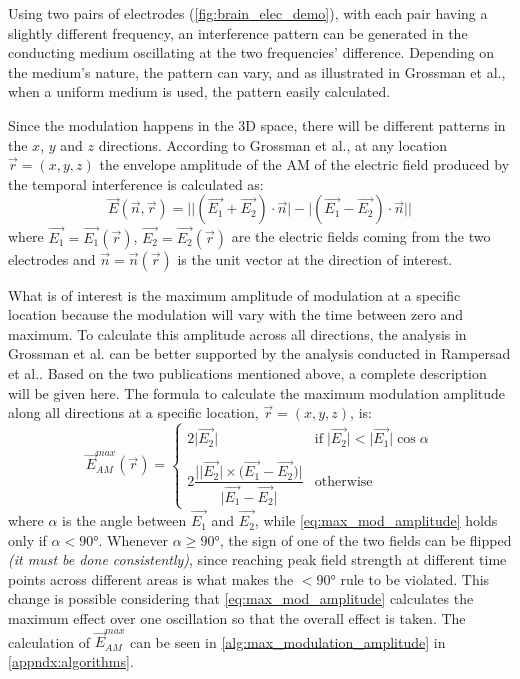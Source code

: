 Using two pairs of electrodes (\autoref{fig:brain_elec_demo}), with each pair having a slightly different frequency, an interference pattern can be generated in the conducting medium oscillating at the two frequencies' difference. Depending on the medium's nature, the pattern can vary, and as illustrated in Grossman et al.\cite{Grossman2017}, when a uniform medium is used, the pattern easily calculated.

Since the modulation happens in the 3D space, there will be different patterns in the $x$, $y$ and $z$ directions. According to Grossman et al.\cite[page 20]{Grossman2017}, at any location $\vec{r} = (x,y,z)$ the envelope amplitude of the \gls{AM} of the electric field produced by the temporal interference is calculated as:
\begin{equation}
    \label{eq:directional_amplitude}
    \vec{E}(\vec{n},\vec{r}) = \Big|\big|(\vec{E_1} + \vec{E_2})\cdot\vec{n}\big| - \big|(\vec{E_1} - \vec{E_2})\cdot\vec{n}\big|\Big|
\end{equation}
where $\vec{E_1} = \vec{E_1}(\vec{r})$, $\vec{E_2} = \vec{E_2}(\vec{r})$ are the electric fields coming from the two electrodes and $\vec{n} = \vec{n}(\vec{r})$ is the unit vector at the direction of interest.
\\\vspace{1pt}

What is of interest is the maximum amplitude of modulation at a specific location because the modulation will vary with the time between zero and maximum. To calculate this amplitude across all directions, the analysis in Grossman et al.\cite[page 20]{Grossman2017} can be better supported by the analysis conducted in Rampersad et al.\cite[section 2.5]{Rampersad2019}. Based on the two publications mentioned above, a complete description will be given here. The formula to calculate the maximum modulation amplitude along all directions at a specific location, $\vec{r} = (x,y,z)$, is:
\begin{equation}
    \label{eq:max_mod_amplitude}
    \vec{E}_{AM}^{max}(\vec{r}) = \begin{cases}
        2\big|\vec{E_2}\big| & \text{if}\; \big|\vec{E_2}\big| < \big|\vec{E_1}\big|\cos\alpha \\
        &\\
      2\dfrac{\Big|\big|\vec{E_2}\big|\times\big(\vec{E_1} - \vec{E_2}\big)\Big|}{\big|\vec{E_1} - \vec{E_2}\big|} & \text{otherwise}
    \end{cases}
\end{equation}
where $\alpha$ is the angle between $\vec{E_1}$ and $\vec{E_2}$, while \autoref{eq:max_mod_amplitude} holds only if $\alpha < 90\si{\degree}$. Whenever $\alpha \geq 90\si{\degree}$, the sign of one of the two fields can be flipped \textit{(it must be done consistently)}, since reaching peak field strength at different time points across different areas is what makes the $< 90\si{\degree}$ rule to be violated. This change is possible considering that \autoref{eq:max_mod_amplitude} calculates the maximum effect over one oscillation so that the overall effect is taken. The calculation of $\vec{E}_{AM}^{max}$ can be seen in \autoref{alg:max_modulation_amplitude} in \autoref{appndx:algorithms}.
